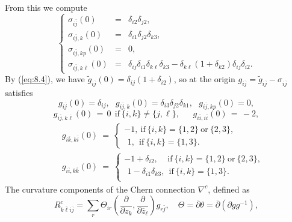 \documentclass{amsart}
\numberwithin{equation}{section}
\theoremstyle{definition}
\renewcommand{\1}{\mathds{1}}
\renewcommand{\>}{\rightarrow}
\begin{document}
From this we compute
\begin{equation} \label{eq:8.10}
\left\{ \begin{array}{llll} \sigma_{i\overline{j}}(0) & = & \delta_{i2}\delta_{j2}, \\
\sigma_{i\overline{j},k}(0) & = & \delta_{i1}\delta_{j2}\delta_{k3}, \\
 \sigma_{i\overline{j},kp}(0) & = & 0,\\
 \sigma_{i\overline{j},k\overline{\ell}}(0)  & = & \delta_{ij}\delta_{i1} \delta_{k\ell}\delta_{k3} - \delta_{k\ell} (1+\delta_{k2})\delta_{ij} \delta_{i2}.
\end{array}  \right.
\end{equation}
By (\ref{eq:8.4}), we have $\tilde{g}_{i\overline{j}}(0)=\delta_{ij}(1+\delta_{i2})$, so at the origin $g_{i\overline{j}}=\tilde{g}_{i\overline{j}} - \sigma_{i\overline{j}}$ satisfies
\begin{equation} \label{eq:8.11}
 g_{i\overline{j}}(0) = \delta_{ij}, \ \ \
g_{i\overline{j},k}(0) = \delta_{i3}\delta_{j2}\delta_{k1}, \ \ \
 g_{i\overline{j},kp}(0) =0,
\end{equation}
\begin{equation} \label{eq:8.12}
g_{i\overline{j},k\overline{\ell}}(0)  \,= \,0  \  \ \mbox{if} \ \{ i,k\} \neq \{ j,\ell\}, \ \ \ \ \ \ \  g_{i\overline{i},i\overline{i}}(0) \,  = \, -2,
\end{equation}
\begin{eqnarray}
\label{eq:8.13} && g_{i\overline{k},k\overline{i}}(0)  \ = \  \left\{ \begin{array}{ll} -1, \ \mbox{if} \ \{ i,k\} = \{ 1,2\} \ \mbox{or} \ \{ 2,3\} , \\ \ \,1, \ \ \mbox{if} \ \{ i,k\} = \{ 1,3\} .\end{array} \right. \\
\label{eq:8.14} && g_{i\overline{i},k\overline{k}}(0)  \ = \ \left\{ \begin{array}{lll} -1 + \delta_{i2},\ \ \ \ \ \mbox{if} \ \{ i,k\} = \{ 1,2\} \ \mbox{or} \ \{ 2,3\} , \\ \ \,1-\delta_{i1}\delta_{k3}, \ \ \mbox{if} \  \{ i,k\} = \{ 1,3\} . \\ \end{array} \right.
\end{eqnarray}
The curvature components of the Chern connection $\nabla^c$, defined as
\[ R^c_{k\overline{\ell}i\overline{j}} = \sum_r \Theta_{ir}(\frac{\partial}{\partial z_k},\frac{\partial}{\partial \overline{z}_\ell})g_{r\bar{j}},
\quad \Theta = \overline{\partial} \theta =\overline{\partial} (\partial g g^{-1}),\]
\end{document}
